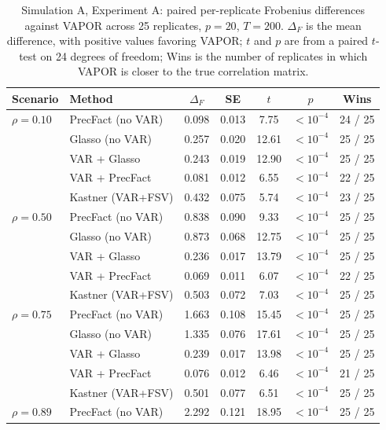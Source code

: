 \begin{table}[h!]
\centering
\small
\caption{Simulation A, Experiment A: paired per-replicate Frobenius differences against VAPOR across 25 replicates, $p=20$, $T=200$. $\Delta_F$ is the mean difference, with positive values favoring VAPOR; $t$ and $p$ are from a paired $t$-test on 24 degrees of freedom; Wins is the number of replicates in which VAPOR is closer to the true correlation matrix.}
\label{tab:sim-a-paired-autocorr}
\begin{tabular}{llccccc}
\toprule
Scenario & Method & $\Delta_F$ & SE & $t$ & $p$ & Wins \\
\midrule
$\rho = 0.10$ & PrecFact (no VAR)  & 0.098 & 0.013 & 7.75 & $<10^{-4}$ & 24 / 25 \\
              & Glasso (no VAR)    & 0.257 & 0.020 & 12.61 & $<10^{-4}$ & 25 / 25 \\
              & VAR + Glasso       & 0.243 & 0.019 & 12.90 & $<10^{-4}$ & 25 / 25 \\
              & VAR + PrecFact     & 0.081 & 0.012 &  6.55 & $<10^{-4}$ & 22 / 25 \\
              & Kastner (VAR+FSV)  & 0.432 & 0.075 &  5.74 & $<10^{-4}$ & 23 / 25 \\
\midrule
$\rho = 0.50$ & PrecFact (no VAR)  & 0.838 & 0.090 &  9.33 & $<10^{-4}$ & 25 / 25 \\
              & Glasso (no VAR)    & 0.873 & 0.068 & 12.75 & $<10^{-4}$ & 25 / 25 \\
              & VAR + Glasso       & 0.236 & 0.017 & 13.79 & $<10^{-4}$ & 25 / 25 \\
              & VAR + PrecFact     & 0.069 & 0.011 &  6.07 & $<10^{-4}$ & 22 / 25 \\
              & Kastner (VAR+FSV)  & 0.503 & 0.072 &  7.03 & $<10^{-4}$ & 25 / 25 \\
\midrule
$\rho = 0.75$ & PrecFact (no VAR)  & 1.663 & 0.108 & 15.45 & $<10^{-4}$ & 25 / 25 \\
              & Glasso (no VAR)    & 1.335 & 0.076 & 17.61 & $<10^{-4}$ & 25 / 25 \\
              & VAR + Glasso       & 0.239 & 0.017 & 13.98 & $<10^{-4}$ & 25 / 25 \\
              & VAR + PrecFact     & 0.076 & 0.012 &  6.46 & $<10^{-4}$ & 21 / 25 \\
              & Kastner (VAR+FSV)  & 0.501 & 0.077 &  6.51 & $<10^{-4}$ & 25 / 25 \\
\midrule
$\rho = 0.89$ & PrecFact (no VAR)  & 2.292 & 0.121 & 18.95 & $<10^{-4}$ & 25 / 25 \\

\end{tabular}
\end{table}
